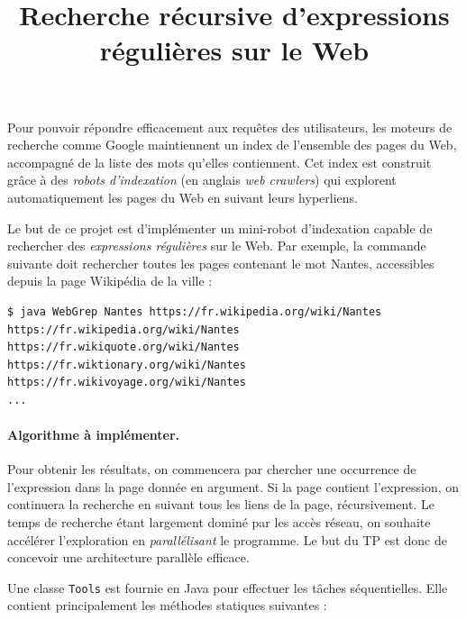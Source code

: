 \documentclass{td}
\title{Recherche récursive d'expressions régulières sur le Web}
\begin{document}
\maketitle

Pour pouvoir répondre efficacement aux requêtes des utilisateurs,
les moteurs de recherche comme Google maintiennent un index de l'ensemble des pages du Web,
accompagné de la liste des mots qu'elles contiennent.
Cet index est construit grâce à des \emph{robots d'indexation}
(en anglais \emph{web crawlers})
qui explorent automatiquement les pages du Web en suivant leurs hyperliens.

Le but de ce projet est d'implémenter un mini-robot d'indexation
capable de rechercher des \emph{expressions régulières} sur le Web.
Par exemple, la commande suivante doit rechercher toutes les pages contenant le mot \og{}Nantes\fg{},
accessibles depuis la page Wikipédia de la ville :

\begin{lstlisting}
$ java WebGrep Nantes https://fr.wikipedia.org/wiki/Nantes
https://fr.wikipedia.org/wiki/Nantes
https://fr.wikiquote.org/wiki/Nantes
https://fr.wiktionary.org/wiki/Nantes
https://fr.wikivoyage.org/wiki/Nantes
...
\end{lstlisting}

\paragraph{Algorithme à implémenter.}

Pour obtenir les résultats, on commencera par chercher une occurrence de l'expression dans la page donnée en argument.
Si la page contient l'expression, on continuera la recherche en suivant tous les liens de la page, récursivement.
Le temps de recherche étant largement dominé par les accès réseau, on souhaite accélérer l'exploration
en \emph{parallélisant} le programme.  
Le but du TP est donc de concevoir une architecture parallèle efficace.

Une classe \lstinline{Tools} est fournie en Java pour effectuer les tâches séquentielles.
Elle contient principalement les méthodes statiques suivantes :
\end{document}
